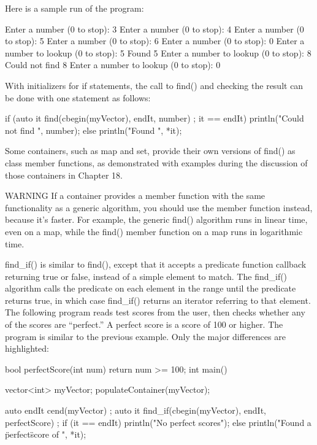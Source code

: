 Here is a sample run of the program:

\begin{shell}
Enter a number (0 to stop): 3
Enter a number (0 to stop): 4
Enter a number (0 to stop): 5
Enter a number (0 to stop): 6
Enter a number (0 to stop): 0
Enter a number to lookup (0 to stop): 5
Found 5
Enter a number to lookup (0 to stop): 8
Could not find 8
Enter a number to lookup (0 to stop): 0
\end{shell}

With initializers for if statements, the call to find() and checking the result can be done with one statement as follows:

\begin{cpp}
if (auto it { find(cbegin(myVector), endIt, number) }; it == endIt) {
    println("Could not find {}", number);
} else {
    println("Found {}", *it);
}
\end{cpp}

Some containers, such as map and set, provide their own versions of find() as class member functions, as demonstrated with examples during the discussion of those containers in Chapter 18.

\begin{myWarning}{WARNING}
If a container provides a member function with the same functionality as a generic algorithm, you should use the member function instead, because it’s faster. For example, the generic find() algorithm runs in linear time, even on a map, while the find() member function on a map runs in logarithmic time.
\end{myWarning}

find\_if() is similar to find(), except that it accepts a predicate function callback returning true or false, instead of a simple element to match. The find\_if() algorithm calls the predicate on each element in the range until the predicate returns true, in which case find\_if() returns an iterator referring to that element. The following program reads test scores from the user, then checks whether any of the scores are “perfect.” A perfect score is a score of 100 or higher. The program is similar to the previous example. Only the major differences are highlighted:

\begin{cpp}
bool perfectScore(int num) { return num >= 100; }
int main()
{
    vector<int> myVector;
    populateContainer(myVector);

    auto endIt { cend(myVector) };
    auto it { find_if(cbegin(myVector), endIt, perfectScore) };
    if (it == endIt) {
        println("No perfect scores");
    } else {
        println("Found a \"perfect\" score of {}", *it);
    }
}
\end{cpp}

